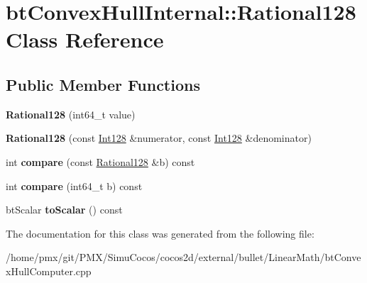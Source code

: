 \hypertarget{classbtConvexHullInternal_1_1Rational128}{}\section{bt\+Convex\+Hull\+Internal\+:\+:Rational128 Class Reference}
\label{classbtConvexHullInternal_1_1Rational128}
\subsection*{Public Member Functions}
\begin{DoxyCompactItemize}
\item 
\mbox{\label{classbtConvexHullInternal_1_1Rational128_a63195d24933e0fd0816904d48a93046c}} 
{\bfseries Rational128} (int64\+\_\+t value)
\item 
\mbox{\label{classbtConvexHullInternal_1_1Rational128_a3975f5b5195d5f5ab19fdb52c9f6dba9}} 
{\bfseries Rational128} (const \hyperlink{classbtConvexHullInternal_1_1Int128}{Int128} \&numerator, const \hyperlink{classbtConvexHullInternal_1_1Int128}{Int128} \&denominator)
\item 
\mbox{\label{classbtConvexHullInternal_1_1Rational128_a3ea3fa9bdd6d5130c7f222239cdae06c}} 
int {\bfseries compare} (const \hyperlink{classbtConvexHullInternal_1_1Rational128}{Rational128} \&b) const
\item 
\mbox{\label{classbtConvexHullInternal_1_1Rational128_a33b8bb6bd517a36276b3355d05308d98}} 
int {\bfseries compare} (int64\+\_\+t b) const
\item 
\mbox{\label{classbtConvexHullInternal_1_1Rational128_a1772e860204031f90621f25da9d8e44b}} 
bt\+Scalar {\bfseries to\+Scalar} () const
\end{DoxyCompactItemize}


The documentation for this class was generated from the following file\+:\begin{DoxyCompactItemize}
\item 
/home/pmx/git/\+P\+M\+X/\+Simu\+Cocos/cocos2d/external/bullet/\+Linear\+Math/bt\+Convex\+Hull\+Computer.\+cpp\end{DoxyCompactItemize}
